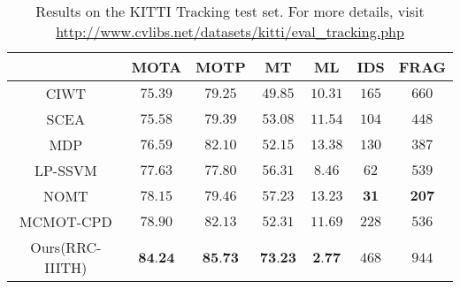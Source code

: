 \documentclass[letterpaper, 10 pt, conference]{ieeeconf}
\begin{document}
\begin{table*}[!hbt]
	\centering
    
    \caption{Results on the KITTI Tracking test set. For more details, visit \url{http://www.cvlibs.net/datasets/kitti/eval_tracking.php}}
    
    \begin{adjustbox}{max width=\linewidth}    
	\begin{tabular}{|c|c|c|c|c|c|c|}
		\hline\hline
    	 &  MOTA & MOTP & MT & ML & IDS & FRAG \\
      	\hline\hline
        CIWT \cite{CIWT} & $75.39$ & $79.25$ &$49.85$ & $10.31$ & $165$ & $660$  \\
        \hline
        SCEA \cite{SCEA} & $75.58$ & $79.39$ &$53.08$ & $11.54$ & $104$ & $448$  \\
        \hline
     	MDP \cite{MDPTracker} & $76.59$ & $82.10$ &$52.15$ & $13.38$ & $130$ & $387$   \\
    	\hline
        LP-SSVM \cite{ijcv2017} & $77.63$ & $77.80$ &$56.31$ & $8.46$ & $62$ & $539$  \\
        \hline
       NOMT \cite{NOMT} & $78.15 $ & $79.46$ &$57.23$ & $13.23$ & $\textbf{31}$ & $\textbf{207}$  \\
        \hline
       MCMOT-CPD \cite{eccv2016} & $78.90$ & $82.13 $ &$52.31$ & $11.69$ & $228$ & $536$  \\
    	\hline
    	Ours(RRC-IIITH) & $\textbf{84.24}$ & $\textbf{85.73}$ &$\textbf{73.23}$ & $\textbf{2.77}$ & $468$ & $944$  \\
    	\hline
        
	\end{tabular}
    \end{adjustbox}
    \label{table:test}
\end{table*}
\end{document}

